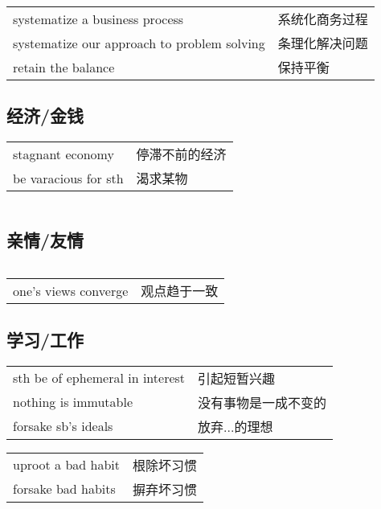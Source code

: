 \begin{tabular}{ll}
    systematize a business process              & 系统化商务过程 \\
    systematize our approach to problem solving & 条理化解决问题 \\
    retain the balance                          & 保持平衡    \\
\end{tabular}

\subsection{经济/金钱}

\begin{tabular}{ll}
    stagnant economy     & 停滞不前的经济 \\
    be varacious for sth & 渴求某物    \\
\end{tabular}

\begin{tabular}{ll}
\end{tabular}

\subsection{亲情/友情}

\begin{tabular}{ll}
\end{tabular}

\begin{tabular}{ll}
    one's views converge & 观点趋于一致 \\
\end{tabular}

\subsection{学习/工作}

\begin{tabular}{ll}
    sth be of ephemeral in interest & 引起短暂兴趣     \\
    nothing is immutable            & 没有事物是一成不变的 \\
    forsake sb's ideals             & 放弃...的理想   \\
\end{tabular}

\begin{tabular}{ll}
    uproot a bad habit & 根除坏习惯 \\
    forsake bad habits & 摒弃坏习惯 \\
\end{tabular}
